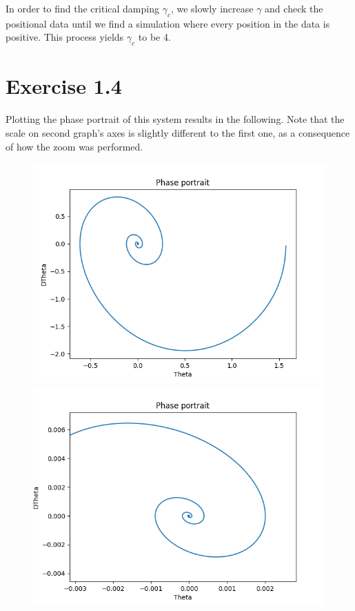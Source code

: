 \documentclass[a4paper,12pt]{article}
\begin{document}
In order to find the critical damping $\gamma_c$, we slowly increase $\gamma$ and check the positional data until we
find a simulation where every position in the data is positive. This process yields $\gamma_c$ to be 4.

\section*{Exercise 1.4}

Plotting the phase portrait of this system results in the following. Note that the scale on second graph's axes is
slightly different to the first one, as a consequence of how the zoom was performed.

\begin{figure}[!ht]
  \centering
  \begin{minipage}{0.45\textwidth}
    \includegraphics[width=\textwidth]{img/4-phaseportrait.png}
  \end{minipage}
  \begin{minipage}{0.45\textwidth}
    \includegraphics[width=\textwidth]{img/4-phaseportrait-zoom.png}
  \end{minipage}
\end{figure}
\end{document}
